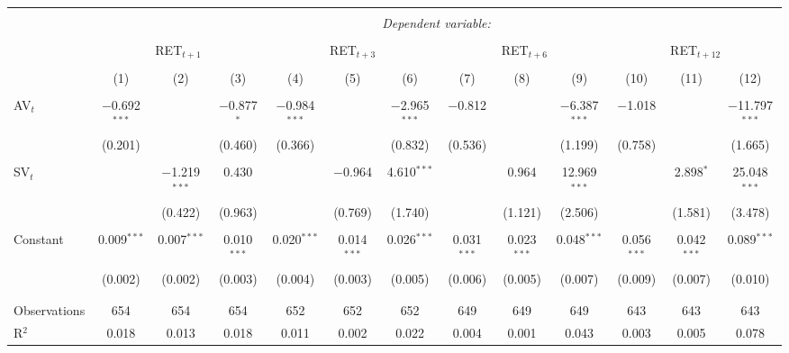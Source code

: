 
\begin{table}[!htbp] \centering 
  \caption{} 
  \label{} 
\begin{tabular}{@{\extracolsep{5pt}}lcccccccccccc} 
\\[-1.8ex]\hline 
\hline \\[-1.8ex] 
 & \multicolumn{12}{c}{\textit{Dependent variable:}} \\ 
\cline{2-13} 
\\[-1.8ex] & \multicolumn{3}{c}{RET$_{t+1}$} & \multicolumn{3}{c}{RET$_{t+3}$} & \multicolumn{3}{c}{RET$_{t+6}$} & \multicolumn{3}{c}{RET$_{t+12}$} \\ 
\\[-1.8ex] & (1) & (2) & (3) & (4) & (5) & (6) & (7) & (8) & (9) & (10) & (11) & (12)\\ 
\hline \\[-1.8ex] 
 AV$_{t}$ & $-$0.692$^{***}$ &  & $-$0.877$^{*}$ & $-$0.984$^{***}$ &  & $-$2.965$^{***}$ & $-$0.812 &  & $-$6.387$^{***}$ & $-$1.018 &  & $-$11.797$^{***}$ \\ 
  & (0.201) &  & (0.460) & (0.366) &  & (0.832) & (0.536) &  & (1.199) & (0.758) &  & (1.665) \\ 
  & & & & & & & & & & & & \\ 
 SV$_{t}$ &  & $-$1.219$^{***}$ & 0.430 &  & $-$0.964 & 4.610$^{***}$ &  & 0.964 & 12.969$^{***}$ &  & 2.898$^{*}$ & 25.048$^{***}$ \\ 
  &  & (0.422) & (0.963) &  & (0.769) & (1.740) &  & (1.121) & (2.506) &  & (1.581) & (3.478) \\ 
  & & & & & & & & & & & & \\ 
 Constant & 0.009$^{***}$ & 0.007$^{***}$ & 0.010$^{***}$ & 0.020$^{***}$ & 0.014$^{***}$ & 0.026$^{***}$ & 0.031$^{***}$ & 0.023$^{***}$ & 0.048$^{***}$ & 0.056$^{***}$ & 0.042$^{***}$ & 0.089$^{***}$ \\ 
  & (0.002) & (0.002) & (0.003) & (0.004) & (0.003) & (0.005) & (0.006) & (0.005) & (0.007) & (0.009) & (0.007) & (0.010) \\ 
  & & & & & & & & & & & & \\ 
\hline \\[-1.8ex] 
Observations & 654 & 654 & 654 & 652 & 652 & 652 & 649 & 649 & 649 & 643 & 643 & 643 \\ 
R$^{2}$ & 0.018 & 0.013 & 0.018 & 0.011 & 0.002 & 0.022 & 0.004 & 0.001 & 0.043 & 0.003 & 0.005 & 0.078 \\ 

\end{tabular}
\end{table}
